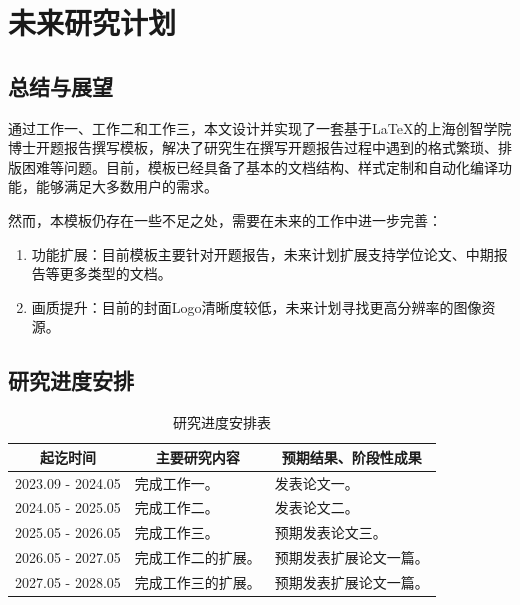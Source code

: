 \chapter{未来研究计划}
\label{sec:future_intro}

\section{总结与展望}

通过工作一、工作二和工作三，本文设计并实现了一套基于\LaTeX 的上海创智学院博士开题报告撰写模板，解决了研究生在撰写开题报告过程中遇到的格式繁琐、排版困难等问题。目前，模板已经具备了基本的文档结构、样式定制和自动化编译功能，能够满足大多数用户的需求。

然而，本模板仍存在一些不足之处，需要在未来的工作中进一步完善：
\begin{enumerate}
    \item 功能扩展：目前模板主要针对开题报告，未来计划扩展支持学位论文、中期报告等更多类型的文档。
    \item 画质提升：目前的封面Logo清晰度较低，未来计划寻找更高分辨率的图像资源。
\end{enumerate}

\section{研究进度安排}

\begin{table}[H]
  \centering
  \caption{研究进度安排表}
  \begin{tabular}{|p{3cm}|p{7cm}|p{5cm}|}
  \hline
  \multicolumn{1}{|c|}{起讫时间} & \multicolumn{1}{c|}{主要研究内容} & \multicolumn{1}{c|}{预期结果、阶段性成果} \\ \hline
  2023.09 - 2024.05 & 完成工作一。 & 发表论文一。 \\[3ex] \hline
  2024.05 - 2025.05 & 完成工作二。 & 发表论文二。 \\[3ex] \hline
  2025.05 - 2026.05 & 完成工作三。 & 预期发表论文三。 \\[3ex] \hline
  2026.05 - 2027.05 & 完成工作二的扩展。 & 预期发表扩展论文一篇。 \\[3ex] \hline
  2027.05 - 2028.05 & 完成工作三的扩展。 & 预期发表扩展论文一篇。 \\[3ex] \hline
  \end{tabular}
\end{table}
